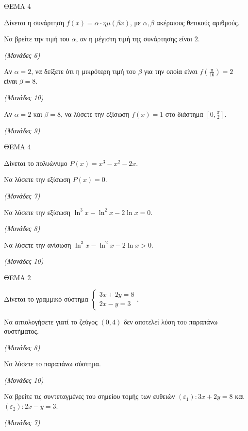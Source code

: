 \documentclass[11pt,a4paper,twoside]{book}
\newcommand{\monades}[1]{\hfill \textit{(Μονάδες #1)}}
\begin{document}
\vspace{4mm}

ΘΕΜΑ 4

Δίνεται η συνάρτηση $f(x) = \alpha \cdot \eta\mu(\beta x)$, με $\alpha, \beta$ ακέραιους θετικούς αριθμούς.\\
\begin{alist}
\item Να βρείτε την τιμή του $\alpha$, αν η μέγιστη τιμή της συνάρτησης είναι $2$.

\monades{6}

\item Αν $\alpha = 2$, να δείξετε ότι η μικρότερη τιμή του $\beta$ για την οποία είναι $f\left(\frac{\pi}{16}\right) = 2$ είναι $\beta = 8$.

\monades{10}

\item Αν $\alpha = 2$ και $\beta = 8$, να λύσετε την εξίσωση $f(x) = 1$ στο διάστημα $\left[0, \frac{\pi}{2}\right]$.

\monades{9}
\end{alist}

\vspace{4mm}

ΘΕΜΑ 4

Δίνεται το πολυώνυμο $P(x) = x^3 - x^2 - 2x$.

\begin{alist}
\item Να λύσετε την εξίσωση $P(x) = 0$.

\monades{7}

\item Να λύσετε την εξίσωση $\ln^3 x - \ln^2 x - 2\ln x = 0$.

\monades{8}

\item Να λύσετε την ανίσωση $\ln^3 x - \ln^2 x - 2\ln x > 0$.

\monades{10}
\end{alist}

\vspace{4mm}

ΘΕΜΑ 2

Δίνεται το γραμμικό σύστημα $\begin{cases} 3x + 2y = 8 \\ 2x - y = 3 \end{cases}$.

\begin{alist}
\item Να αιτιολογήσετε γιατί το ζεύγος $(0, 4)$ δεν αποτελεί λύση του παραπάνω συστήματος.

\monades{8}

\item Να λύσετε το παραπάνω σύστημα.

\monades{10}

\item Να βρείτε τις συντεταγμένες του σημείου τομής των ευθειών $(\varepsilon_1): 3x + 2y = 8$ και $(\varepsilon_2): 2x - y = 3$.

\monades{7}
\end{alist}
\end{document}
